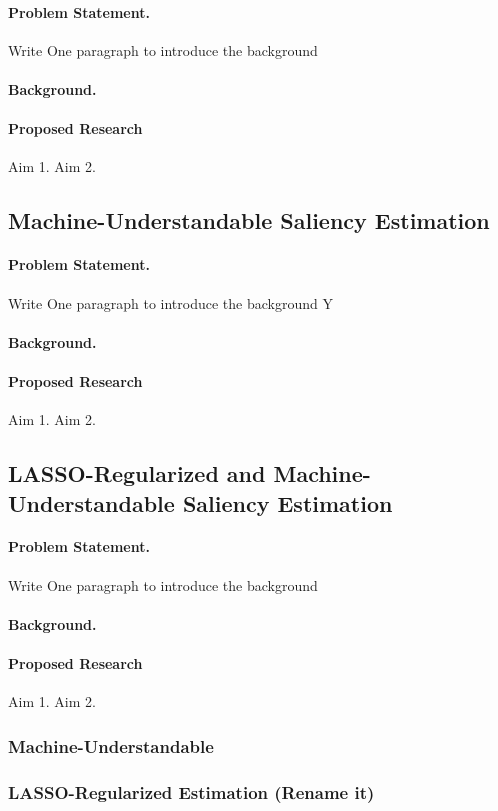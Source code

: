 \paragraph{Problem Statement.}{Write One paragraph to introduce the background
\paragraph{Background.}
\paragraph{Proposed Research}  Aim 1. Aim 2.
\subsection{Machine-Understandable Saliency Estimation}
\paragraph{Problem Statement.}{Write One paragraph to introduce the background
Y\paragraph{Background.}
\paragraph{Proposed Research}  Aim 1. Aim 2.
\subsection{LASSO-Regularized and Machine-Understandable Saliency Estimation}
\paragraph{Problem Statement.}{Write One paragraph to introduce the background
\paragraph{Background.}
\paragraph{Proposed Research} Aim 1. Aim 2.  

\subsubsection{Machine-Understandable}
\subsubsection{LASSO-Regularized Estimation (Rename it)}
}}}
